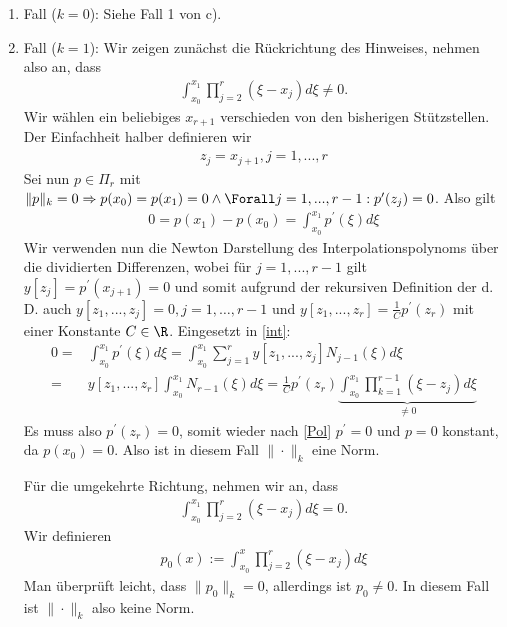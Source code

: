 \begin{solution}
\begin{enumerate}[label = \textbf{\alph*)}]
\begin{enumerate}[label = \textit{\roman*)}]
\begin{enumerate}[label = \textit{\arabic*.}]
    \item Fall ($k = 0$): Siehe Fall 1 von c).
      \item Fall ($k=1$):
      Wir zeigen zunächst die Rückrichtung des Hinweises, nehmen also an, dass
      \begin{align*}
        \int_{x_0}^{x_1} \prod_{j=2}^r \left(\xi - x_j\right)d\xi \neq 0.
      \end{align*}
      Wir wählen ein beliebiges $x_{r+1}$ verschieden von den bisherigen Stützstellen. Der Einfachheit halber definieren wir
      \begin{align*}
        z_j = x_{j+1}, j = 1,...,r
      \end{align*}
      Sei nun $p \in \Pi_r$ mit $\|p\|_k = 0 \Rightarrow p(x_0) = p(x_1) = 0 \land \Forall j=1,...,r-1: p^{\prime}(z_j) = 0$.
      Also gilt
      \begin{align}\label{int}
        0 = p(x_1) - p(x_0) = \int_{x_0}^{x_1}p^{\prime}(\xi) d\xi
      \end{align}
      Wir verwenden nun die Newton Darstellung des Interpolationspolynoms über die dividierten Differenzen, wobei für $j=1,...,r-1$ gilt $y[z_j] = p^{\prime}(x_{j+1}) = 0$ und somit aufgrund der rekursiven Definition der d. D. auch $y[z_1,...,z_j]=0, j = 1,\dots,r-1$ und $y[z_1,...,z_r] = \frac{1}{C}p^{\prime}(z_r)$ mit einer Konstante $C \in \R$.
      Eingesetzt in \eqref{int}:
      \begin{align*}
        0 =& \int_{x_0}^{x_1}p^{\prime}(\xi) d\xi = \int_{x_0}^{x_1} \sum_{j=1}^{r}y[z_1,...,z_j]N_{j-1}(\xi) d\xi \\
        =& y[z_1,...,z_r]\int_{x_0}^{x_1}N_{r-1}(\xi)d\xi = \frac{1}{C}p^{\prime}(z_r)\underbrace{\int_{x_0}^{x_1}\prod_{k=1}^{r-1}(\xi-z_j)d\xi}_{\neq 0}
      \end{align*}
      Es muss also $p^{\prime}(z_r) = 0$, somit wieder nach \eqref{Pol} $p^{\prime} = 0$ und $p = 0$ konstant, da $p(x_0) = 0$. Also ist in diesem Fall $\|\cdot\|_k$ eine Norm.

      Für die umgekehrte Richtung, nehmen wir an, dass
      \begin{align*}
        \int_{x_0}^{x_1} \prod_{j=2}^r \left(\xi - x_j\right)d\xi = 0.
      \end{align*}
      Wir definieren
      \begin{align*}
        p_0(x) := \int_{x_0}^{x} \prod_{j=2}^r \left(\xi - x_j\right)d\xi
      \end{align*}
      Man überprüft leicht, dass $\|p_0\|_k = 0$, allerdings ist $p_0 \neq 0$. In diesem Fall ist $\|\cdot \|_k$ also keine Norm.


\end{enumerate}
\end{enumerate}
\end{enumerate}
\end{solution}
